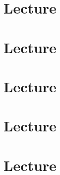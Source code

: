 \documentclass{easyclass}
\begin{document}
\chapter{Lecture}


\chapter{Lecture}


\chapter{Lecture}


\chapter{Lecture}


\chapter{Lecture}



%
\end{document}
